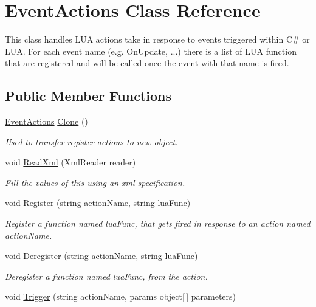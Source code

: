 \hypertarget{class_event_actions}{}\section{Event\+Actions Class Reference}
\label{class_event_actions}


This class handles L\+UA actions take in response to events triggered within C\# or L\+UA. For each event name (e.\+g. On\+Update, ...) there is a list of L\+UA function that are registered and will be called once the event with that name is fired.  


\subsection*{Public Member Functions}
\begin{DoxyCompactItemize}
\item 
\hyperlink{class_event_actions}{Event\+Actions} \hyperlink{class_event_actions_a47d30ed28e530388cc005a58ba507f4e}{Clone} ()
\begin{DoxyCompactList}\small\item\em Used to transfer register actions to new object. \end{DoxyCompactList}\item 
void \hyperlink{class_event_actions_a566d71637c9b0eef462b1c03c7ef8845}{Read\+Xml} (Xml\+Reader reader)
\begin{DoxyCompactList}\small\item\em Fill the values of this using an xml specification. \end{DoxyCompactList}\item 
void \hyperlink{class_event_actions_a1a364d74c5363a6a20c50db59100472a}{Register} (string action\+Name, string lua\+Func)
\begin{DoxyCompactList}\small\item\em Register a function named lua\+Func, that gets fired in response to an action named action\+Name. \end{DoxyCompactList}\item 
void \hyperlink{class_event_actions_a1537bfd03582825716502a960ff1b041}{Deregister} (string action\+Name, string lua\+Func)
\begin{DoxyCompactList}\small\item\em Deregister a function named lua\+Func, from the action. \end{DoxyCompactList}\item 
void \hyperlink{class_event_actions_a732a0dd92722a0d30bab61df00ccb46c}{Trigger} (string action\+Name, params object\mbox{[}$\,$\mbox{]} parameters)

\end{DoxyCompactItemize}

